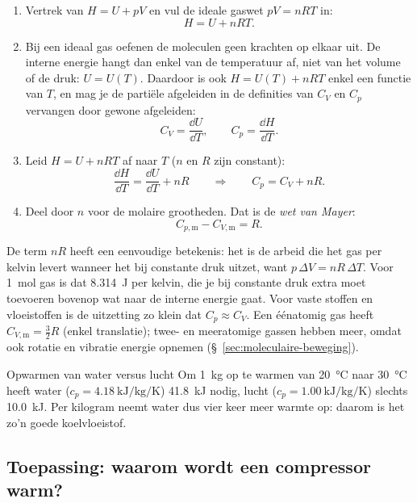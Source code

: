 \begin{enumerate}
\item Vertrek van $H = U + pV$ en vul de ideale gaswet $pV = nRT$ in:
\[
H = U + nRT .
\]
\item Bij een ideaal gas oefenen de moleculen geen krachten op elkaar uit. De interne energie hangt dan enkel van de temperatuur af, niet van het volume of de druk: $U = U(T)$. Daardoor is ook $H = U(T) + nRT$ enkel een functie van $T$, en mag je de parti\"ele afgeleiden in de definities van $C_V$ en $C_p$ vervangen door gewone afgeleiden:
\[
C_V = \frac{\dd U}{\dd T}, \qquad C_p = \frac{\dd H}{\dd T}.
\]
\item Leid $H = U + nRT$ af naar $T$ ($n$ en $R$ zijn constant):
\[
\frac{\dd H}{\dd T} = \frac{\dd U}{\dd T} + nR
\qquad\Longrightarrow\qquad
C_p = C_V + nR .
\]
\item Deel door $n$ voor de molaire grootheden. Dat is de \emph{wet van Mayer}:
\begin{equation}
C_{p,\mathrm{m}} - C_{V,\mathrm{m}} = R .
\label{eq:mayer}
\end{equation}
\end{enumerate}
De term $nR$ heeft een eenvoudige betekenis: het is de arbeid die het gas per kelvin levert wanneer het bij constante druk uitzet, want $p\,\Delta V = nR\,\Delta T$. Voor \SI{1}{\mole} gas is dat \SI{8.314}{\joule} per kelvin, die je bij constante druk extra moet toevoeren bovenop wat naar de interne energie gaat. Voor vaste stoffen en vloeistoffen is de uitzetting zo klein dat $C_p \approx C_V$.
Een \'e\'enatomig gas heeft $C_{V,\mathrm{m}} = \tfrac{3}{2}R$ (enkel translatie); twee- en meeratomige gassen hebben meer, omdat ook rotatie en vibratie energie opnemen (\S~\ref{sec:moleculaire-beweging}).

\begin{voorbeeld}{Opwarmen van water versus lucht}
Om \SI{1}{\kilogram} op te warmen van \SI{20}{\celsius} naar \SI{30}{\celsius} heeft water ($c_p = \SI{4.18}{\kilo\joule\per\kilogram\per\kelvin}$) \SI{41.8}{\kilo\joule} nodig, lucht ($c_p = \SI{1.00}{\kilo\joule\per\kilogram\per\kelvin}$) slechts \SI{10.0}{\kilo\joule}. Per kilogram neemt water dus vier keer meer warmte op: daarom is het zo'n goede koelvloeistof.
\end{voorbeeld}

\subsection{Toepassing: waarom wordt een compressor warm?}
\label{sec:compressor}

